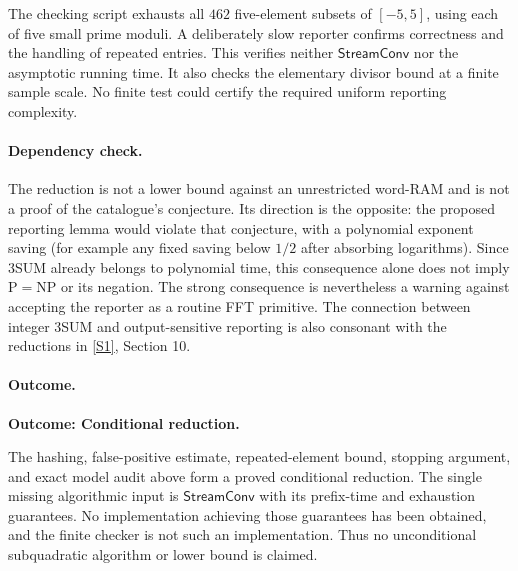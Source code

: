 \documentclass[11pt,a4paper]{article}
\newcommand{\sref}[2]{\hyperlink{source:#1:#2}{[S#2]}}
\numberwithin{equation}{section}
\begin{document}
The checking script exhausts all $462$ five-element subsets of
$[-5,5]$, using each of five small prime moduli. A deliberately slow
reporter confirms correctness and the handling of repeated entries.
This verifies neither $\mathsf{StreamConv}$ nor the asymptotic running
time. It also checks the elementary divisor bound at a finite sample
scale. No finite test could certify the required uniform reporting
complexity.

\paragraph{Dependency check.}
The reduction is not a lower bound against an unrestricted word-RAM and
is not a proof of the catalogue's conjecture. Its direction is the
opposite: the proposed reporting lemma would violate that conjecture,
with a polynomial exponent saving (for example any fixed saving below
$1/2$ after absorbing logarithms). Since 3SUM already belongs to
polynomial time, this consequence alone does not imply
$\mathrm P=\mathrm{NP}$ or its negation. The strong consequence is
nevertheless a warning against accepting the reporter as a routine FFT
primitive. The connection between integer 3SUM and output-sensitive
reporting is also consonant with the reductions in
\sref{161}{1}, Section 10.

\paragraph{Outcome.}
\textbf{Outcome: Conditional reduction.}

The hashing, false-positive estimate, repeated-element bound, stopping
argument, and exact model audit above form a proved conditional reduction.
The single missing algorithmic input is $\mathsf{StreamConv}$ with its
prefix-time and exhaustion guarantees. No implementation achieving those
guarantees has been obtained, and the finite checker is not such an
implementation. Thus no unconditional subquadratic algorithm or lower
bound is claimed.
\end{document}
